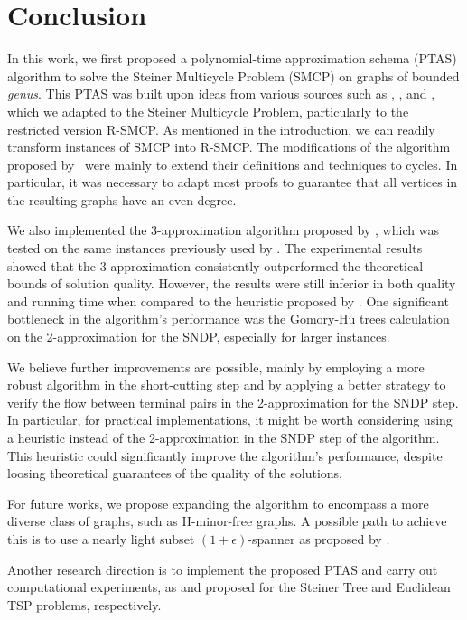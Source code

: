\chapter{Conclusion}
\label{chapter:conclusion}

In this work, we first proposed a polynomial-time approximation schema (PTAS) algorithm to solve the Steiner Multicycle Problem (SMCP) on graphs of bounded \textit{genus}. 
This PTAS was built upon ideas from various sources such as \cite{Borradaile2009b}, \cite{Borradaile2012}, and \cite{Bateni}, which we adapted to the Steiner Multicycle Problem, particularly to the restricted version R-SMCP. 
As mentioned in the introduction, we can readily transform instances of SMCP into R-SMCP.
The modifications of the algorithm proposed by~\citeauthor{Bateni} were mainly to extend their definitions and techniques to cycles. 
In particular, it was necessary to adapt most proofs to guarantee that all vertices in the resulting graphs have an even degree.   

We also implemented the 3-approximation algorithm proposed by \cite{smcp_3apx}, which was tested on the same instances previously used by \cite{Pereira2018TheSM}. 
The experimental results showed that the 3-approximation consistently outperformed the theoretical bounds of solution quality. However, the results were still inferior in both quality and running time when compared to the heuristic proposed by \cite{Pereira2018TheSM}.
One significant bottleneck in the algorithm's performance was the Gomory-Hu trees calculation on the 2-approximation for the SNDP, especially for larger instances.

We believe further improvements are possible, mainly by employing a more robust algorithm in the short-cutting step and by applying a better strategy to verify the flow between terminal pairs in the 2-approximation for the SNDP step.
In particular, for practical implementations, it might be worth considering using a heuristic instead of the 2-approximation in the SNDP step of the algorithm. This heuristic could significantly improve the algorithm's performance, despite loosing theoretical guarantees of the quality of the solutions.

For future works, we propose expanding the algorithm to encompass a more diverse class of graphs, such as H-minor-free graphs. A possible path to achieve this is to use a nearly light subset \((1 + \epsilon)\)-spanner as proposed by \cite{light_spanners_tsp}.

Another research direction is to implement the proposed PTAS and carry out computational experiments, as \cite{TazariLargeConstants} and \cite{implementationPTASeuclidianTSP} proposed for the Steiner Tree and Euclidean TSP problems, respectively.
